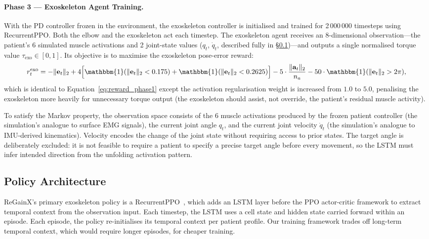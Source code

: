 \documentclass[letterpaper]{article} %
\begin{document}
\paragraph{Phase 3 --- Exoskeleton Agent Training.}
With the PD controller frozen in the environment, the exoskeleton controller is
initialised and trained for 2\,000\,000 timesteps using RecurrentPPO.
Both the elbow and the exoskeleton act each timestep.
The exoskeleton agent receives an 8-dimensional observation---the patient's
6 simulated muscle activations and 2 joint-state values ($q_t$, $\dot{q}_t$,
described fully in \S\ref{sec:policy})---and outputs a single normalised
torque value $\tau_\text{exo}\in[0,1]$.
Its objective is to maximise the exoskeleton pose-error reward:
\begin{equation}
  r_t^{\text{exo}} = -\lVert \mathbf{e}_t \rVert_2
      + 4\Bigl[\mathbbm{1}(\lVert \mathbf{e}_t \rVert_2 < 0.175)
             + \mathbbm{1}(\lVert \mathbf{e}_t \rVert_2 < 0.2625)\Bigr]
      - 5\cdot\frac{\lVert \mathbf{a}_t \rVert_2}{n_a}
      - 50\cdot\mathbbm{1}(\lVert \mathbf{e}_t \rVert_2 > 2\pi),
  \label{eq:reward_exo}
\end{equation}
which is identical to Equation~\ref{eq:reward_phase1} except the activation
regularisation weight is increased from $1.0$ to $5.0$, penalising the
exoskeleton more heavily for unnecessary torque output (the exoskeleton should
assist, not override, the patient's residual muscle activity).

To satisfy the Markov property, the observation space consists of the 6 muscle
activations produced by the frozen patient controller (the simulation's analogue
to surface EMG signals), the current joint angle $q_t$, and the current joint
velocity $\dot{q}_t$ (the simulation's analogue to IMU-derived kinematics).
Velocity encodes the change of the joint state without requiring access to prior
states.
The target angle is deliberately excluded: it is not feasible to require a patient
to specify a precise target angle before every movement, so the LSTM must infer
intended direction from the unfolding activation pattern.

\subsection{Policy Architecture}
\label{sec:policy}

ReGainX's primary exoskeleton policy is a RecurrentPPO~\citep{sb3contrib}, which
adds an LSTM layer before the PPO actor-critic framework to extract temporal
context from the observation input.
Each timestep, the LSTM uses a cell state and hidden state carried forward within
an episode.
Each episode, the policy re-initialises its temporal context per patient profile.
Our training framework trades off long-term temporal context, which would require
longer episodes, for cheaper training.
\end{document}
